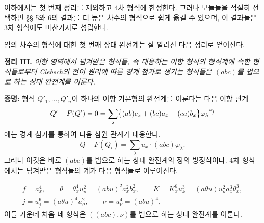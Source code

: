 이하에서는 첫 번째 정리를 제외하고 4차 형식에 한정한다. 그러나 모듈들을 적절히 선택하면 §§ 5와 6의 결과를 더 높은 차수의 형식으로 쉽게 옮길 수 있으며, 이 결과들은 3차 형식에도 마찬가지로 성립한다.

임의 차수의 형식에 대한 첫 번째 상대 완전계는 잘 알려진 다음 정리로 얻어진다.

\clearpage
\noindent\textbf{정리 III.}
\emph{이항 영역에서 넘겨받은 형식들, 즉 대응하는 이항 형식의 형식계에 속한 형식들로부터 Clebsch의 전이 원리에 따른 경계 첨가로 생기는 형식들은 $(abc)$를 법으로 하는 상대 완전계를 이룬다.}

\noindent\textbf{증명:}
형식 $Q'_1,\ldots,Q'_n$이 하나의 이항 기본형의 완전계를 이룬다는 다음 이항 관계
\[
Q'-F(Q')=0=\sum_\lambda\bigl\{(ab)c_x+(bc)a_x+(ca)b_x\bigr\}\varphi_\lambda\srcfnmark{*)}
\]
에는 경계 첨가를 통하여 다음 삼원 관계가 대응한다.
\[
Q-F(Q_i)=\sum_\lambda u_x\cdot(abc)\varphi_\lambda .
\]
그러나 이것은 바로 $(abc)$를 법으로 하는 상대 완전계의 정의 방정식이다. 4차 형식에서는 넘겨받은 형식들의 계가 다음 형식들로 이루어진다.

\[
\begin{gathered}
f=a_x^4,\qquad
\theta=\theta_x^4u_\vartheta^2=(abu)^2a_x^2b_x^2,
\qquad
K=K_x^6u_k^3=(a\theta u)u_\vartheta^2a_x^3\theta_x^3,\\
j=u_j^6=(a\theta u)^4u_\vartheta^2,\qquad
\nu=u_\nu^4=(abu)^4,
\end{gathered}
\]
이들 가운데 처음 네 형식은 $((abc),\nu)$를 법으로 하는 상대 완전계를 이룬다.

